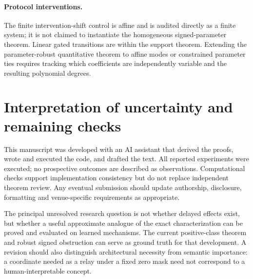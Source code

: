 \paragraph{Protocol interventions.} The finite intervention-shift control is affine and is audited directly as a finite system; it is not claimed to instantiate the homogeneous signed-parameter theorem. Linear gated transitions are within the support theorem. Extending the parameter-robust quantitative theorem to affine modes or constrained parameter ties requires tracking which coefficients are independently variable and the resulting polynomial degrees.

\section{Interpretation of uncertainty and remaining checks}
This manuscript was developed with an AI assistant that derived the proofs, wrote and executed the code, and drafted the text. All reported experiments were executed; no prospective outcomes are described as observations. Computational checks support implementation consistency but do not replace independent theorem review. Any eventual submission should update authorship, disclosure, formatting and venue-specific requirements as appropriate.

The principal unresolved research question is not whether delayed effects exist, but whether a useful approximate analogue of the exact characterization can be proved and evaluated on learned mechanisms. The current positive-class theorem and robust signed obstruction can serve as ground truth for that development. A revision should also distinguish architectural necessity from semantic importance: a coordinate needed as a relay under a fixed zero mask need not correspond to a human-interpretable concept.
